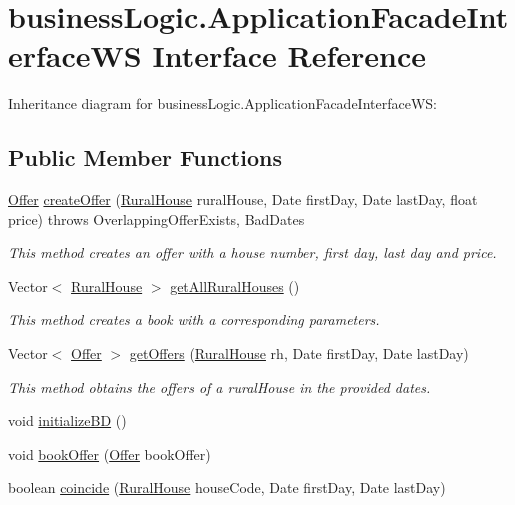\hypertarget{interfacebusinessLogic_1_1ApplicationFacadeInterfaceWS}{}\section{business\+Logic.\+Application\+Facade\+Interface\+WS Interface Reference}
\label{interfacebusinessLogic_1_1ApplicationFacadeInterfaceWS}


Inheritance diagram for business\+Logic.\+Application\+Facade\+Interface\+WS\+:
\subsection*{Public Member Functions}
\begin{DoxyCompactItemize}
\item 
\mbox{\hyperlink{classdomain_1_1Offer}{Offer}} \mbox{\hyperlink{interfacebusinessLogic_1_1ApplicationFacadeInterfaceWS_a0e8d2135ef1384a32e74f60bcea55f09}{create\+Offer}} (\mbox{\hyperlink{classdomain_1_1RuralHouse}{Rural\+House}} rural\+House, Date first\+Day, Date last\+Day, float price)  throws Overlapping\+Offer\+Exists, Bad\+Dates
\begin{DoxyCompactList}\small\item\em This method creates an offer with a house number, first day, last day and price. \end{DoxyCompactList}\item 
Vector$<$ \mbox{\hyperlink{classdomain_1_1RuralHouse}{Rural\+House}} $>$ \mbox{\hyperlink{interfacebusinessLogic_1_1ApplicationFacadeInterfaceWS_a553cbfb37ea9f1621ba76ad8308a15da}{get\+All\+Rural\+Houses}} ()
\begin{DoxyCompactList}\small\item\em This method creates a book with a corresponding parameters. \end{DoxyCompactList}\item 
Vector$<$ \mbox{\hyperlink{classdomain_1_1Offer}{Offer}} $>$ \mbox{\hyperlink{interfacebusinessLogic_1_1ApplicationFacadeInterfaceWS_ae338a96d039003c64fceb68d667736f1}{get\+Offers}} (\mbox{\hyperlink{classdomain_1_1RuralHouse}{Rural\+House}} rh, Date first\+Day, Date last\+Day)
\begin{DoxyCompactList}\small\item\em This method obtains the offers of a rural\+House in the provided dates. \end{DoxyCompactList}\item 
void \mbox{\hyperlink{interfacebusinessLogic_1_1ApplicationFacadeInterfaceWS_a59eacfa5890466c6a338d0df2e487965}{initialize\+BD}} ()
\item 
void \mbox{\hyperlink{interfacebusinessLogic_1_1ApplicationFacadeInterfaceWS_a9f2916ad64674d13dbfbe58252e28531}{book\+Offer}} (\mbox{\hyperlink{classdomain_1_1Offer}{Offer}} book\+Offer)
\item 
boolean \mbox{\hyperlink{interfacebusinessLogic_1_1ApplicationFacadeInterfaceWS_aa56165d498ff54ccd651fe5ce9a50902}{coincide}} (\mbox{\hyperlink{classdomain_1_1RuralHouse}{Rural\+House}} house\+Code, Date first\+Day, Date last\+Day)
\end{DoxyCompactItemize}


